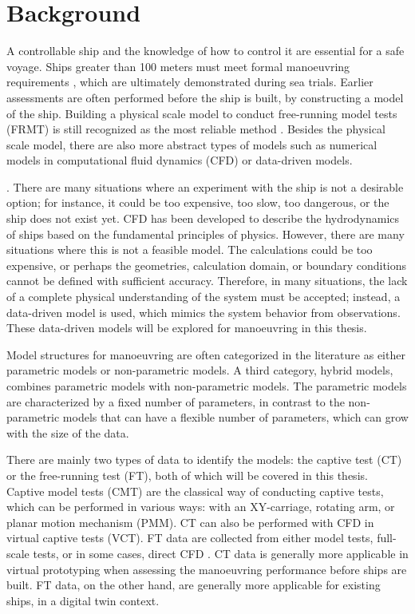 \section{Background}
A controllable ship and the knowledge of how to control it are essential for a safe voyage. Ships greater than 100 meters must meet formal manoeuvring requirements \cite{imoStandardsShipManoeuvrability2002}, which are ultimately demonstrated during sea trials. Earlier assessments are often performed before the ship is built, by constructing a model of the ship. Building a physical scale model to conduct free-running model tests (FRMT) is still recognized as the most reliable method \cite{ittcManeuveringCommitteeITTC2008}. Besides the physical scale model, there are also more abstract types of models such as numerical models in computational fluid dynamics (CFD) or data-driven models.

 \cite{ljungModelingIdentificationDynamic2021}. There are many situations where an experiment with the ship is not a desirable option; for instance, it could be too expensive, too slow, too dangerous, or the ship does not exist yet. CFD has been developed to describe the hydrodynamics of ships based on the fundamental principles of physics. However, there are many situations where this is not a feasible model. The calculations could be too expensive, or perhaps the geometries, calculation domain, or boundary conditions cannot be defined with sufficient accuracy. Therefore, in many situations, the lack of a complete physical understanding of the system must be accepted; instead, a data-driven model is used, which mimics the system behavior from observations. These data-driven models will be explored for manoeuvring in this thesis.

Model structures for manoeuvring are often categorized in the literature as either parametric models or non-parametric models. A third category, hybrid models, combines parametric models with non-parametric models. 
The parametric models are characterized by a fixed number of parameters, in contrast to the non-parametric models that can have a flexible number of parameters, which can grow with the size of the data. 

There are mainly two types of data to identify the models: the captive test (CT) or the free-running test (FT), both of which will be covered in this thesis. Captive model tests (CMT) are the classical way of conducting captive tests, which can be performed in various ways: with an XY-carriage, rotating arm, or planar motion mechanism (PMM). CT can also be performed with CFD in virtual captive tests (VCT). FT data are collected from either model tests, full-scale tests, or in some cases, direct CFD \cite{arakiEstimatingManeuveringCoefficients2012}. CT data is generally more applicable in virtual prototyping when assessing the manoeuvring performance before ships are built. FT data, on the other hand, are generally more applicable for existing ships, in a digital twin context.


